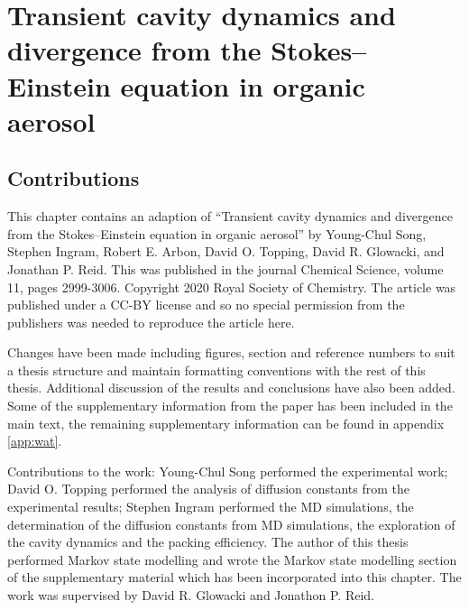 %
%
\let\textcircled=\pgftextcircled
\chapter{Transient cavity dynamics and divergence from the Stokes–Einstein equation in organic aerosol}
\label{chap:water}


\section*{Contributions}

This chapter contains an adaption of ``Transient cavity dynamics and divergence from the Stokes–Einstein equation in organic aerosol'' by Young-Chul Song, Stephen Ingram, Robert E. Arbon, David O. Topping, David R. Glowacki, and Jonathan P. Reid. This was published in the journal Chemical Science, volume 11, pages 2999-3006. Copyright 2020 Royal Society of Chemistry. The article was published under a CC-BY license and so no special permission from the publishers was needed to reproduce the article here. 

Changes have been made including figures, section and reference numbers to suit a thesis structure and maintain formatting conventions with the rest of this thesis. Additional discussion of the results and conclusions have also been added. Some of the supplementary information from the paper has  been included in the main text, the remaining supplementary information can be found in appendix \ref{app:wat}. 

Contributions to the work: Young-Chul Song performed the experimental work; David O. Topping performed the analysis of diffusion constants from the experimental results; Stephen Ingram performed the MD simulations, the determination of the diffusion constants from MD simulations, the exploration of the cavity dynamics and the packing efficiency. The author of this thesis performed Markov state modelling and wrote the Markov state modelling section of the supplementary material which has been incorporated into this chapter. The work was supervised by David R. Glowacki and Jonathon P. Reid. 

